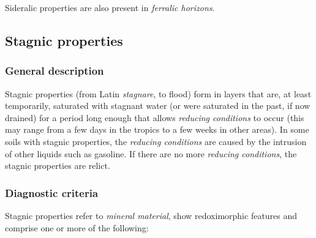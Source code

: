 \documentclass[
  letterpaper,
  DIV=11,
  numbers=noendperiod]{scrreprt}
\begin{document}
Sideralic properties are also present in \emph{ferralic horizons}.

\hypertarget{stagnic-properties}{%
\subsection{Stagnic properties}\label{stagnic-properties}}

\hypertarget{general-description-51}{%
\subsubsection{General description}\label{general-description-51}}

Stagnic properties (from Latin \emph{stagnare}, to flood) form in layers
that are, at least temporarily, saturated with stagnant water (or were
saturated in the past, if now drained) for a period long enough that
allows \emph{reducing conditions} to occur (this may range from a few
days in the tropics to a few weeks in other areas). In some soils with
stagnic properties, the \emph{reducing conditions} are caused by the
intrusion of other liquids such as gasoline. If there are no more
\emph{reducing conditions}, the stagnic properties are relict.

\hypertarget{diagnostic-criteria-53}{%
\subsubsection{Diagnostic criteria}\label{diagnostic-criteria-53}}

Stagnic properties refer to \emph{mineral material}, show redoximorphic
features and comprise one or more of the following:
\end{document}
